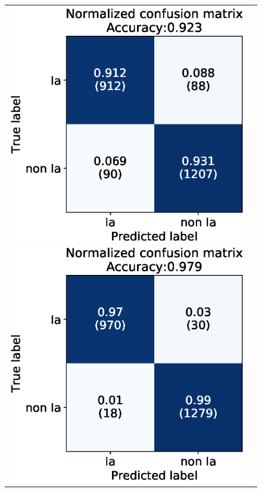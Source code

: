 \documentclass[proof]{pasj01}
\begin{document}
\begin{figure}[htbp]
    \begin{tabular}{cc}
        \begin{minipage}{0.5\hsize}
            \begin{center}
                \includegraphics[width=\columnwidth]{figures/07_CM_PLAsTiCC-1st_submission_aug22_2class_2.eps}
            \end{center}
        \end{minipage}
        \begin{minipage}{0.5\hsize}
            \begin{center}
                \includegraphics[width=\columnwidth]{figures/03_CM_abs-mag_scaled-flux_w-mixup_predictions_test_2.eps}

\end{center}
\end{minipage}
\end{tabular}
\end{figure}
\end{document}
